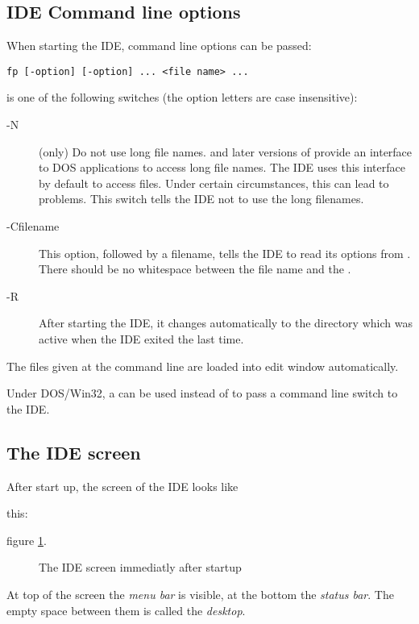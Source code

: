 \subsection{IDE Command line options}
When starting the IDE, command line options can be passed:
\begin{verbatim}
fp [-option] [-option] ... <file name> ...
\end{verbatim}
 is one of the following switches (the option letters
are case insensitive):
\begin{description}
\item [-N] (\dos only) Do not use long file names.  and later
versions of \windows provide an interface to DOS applications to access 
long file names. 
The IDE uses this interface by default to access files. Under certain 
circumstances, this can lead to problems. This switch tells the IDE not to
use the long filenames.
\item [-Cfilename] This option, followed by a filename, tells the IDE to
read its options from . There should be no whitespace between
the file name and the .
\item [-R] After starting the IDE, it changes automatically to the directory
which was active when the IDE exited the last time.
\end{description}
The files given at the command line are loaded into edit
window automatically.

\begin{remark}
Under DOS/Win32, a \var{/} can be used instead of \var{-} to pass a
command line switch to the IDE.
\end{remark}

\subsection{The IDE screen}

After start up, the screen of the IDE looks like 
\begin{htmlonly}
this:
\end{htmlonly}
\begin{latexonly}
figure \ref{fig:idestart}.
\begin{figure}
\caption{The IDE screen immediatly after startup}
\label{fig:idestart}
\ifpdf
{}
\else
{}
\fi
\end{figure}
\end{latexonly}
At top of the screen the \emph{menu bar} is visible, at the bottom
the \emph{status bar}. The empty space between them is called the
\emph{desktop}.

